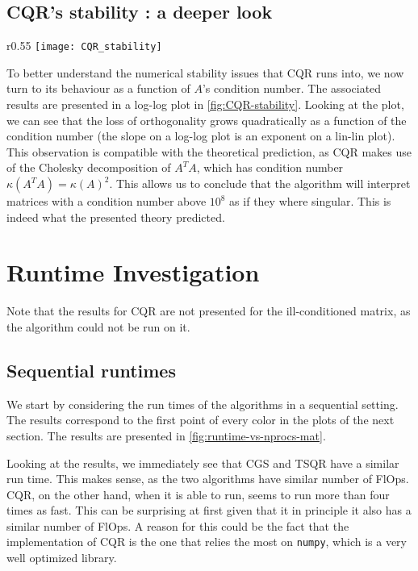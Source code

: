 \documentclass[a4paper, 12pt,oneside]{article}
\begin{document}
			\subsection{CQR's stability : a deeper look}
			\begin{wrapfigure}[18]{r}{0.55\textwidth}
				\centering
				\vspace{-3em}
				\texttt{[image: CQR\_stability]}
				\caption{Loss of orthogonality of the $Q$ matrix obtained by CQR as a function of $A$'s condition number.}
				\label{fig:CQR-stability}
			\end{wrapfigure}
			To better understand the numerical stability issues that CQR runs into, we now turn to its behaviour as a function of $A$'s condition number. The associated results are presented in a log-log plot in \ref{fig:CQR-stability}.
			Looking at the plot, we can see that the loss of orthogonality grows quadratically as a function of the condition number (the slope on a log-log plot is an exponent on a lin-lin plot). This observation is compatible with the theoretical prediction, as CQR makes use of the Cholesky decomposition of $A^TA$, which has condition number $\kappa(A^TA)=\kappa(A)^2$. This allows us to conclude that the algorithm will interpret matrices with a condition number above $10^8$ as if they where singular. This is indeed what the presented theory predicted. 
	\section{Runtime Investigation}
		Note that the results for CQR are not presented for the ill-conditioned matrix, as the algorithm could not be run on it.
		\subsection{Sequential runtimes}
		We start by considering the run times of the algorithms in a sequential setting. The results correspond to the first point of every color in the plots of the next section. The results are presented in \ref{fig:runtime-vs-nprocs-mat}.
		
		Looking at the results, we immediately see that CGS and TSQR have a similar run time. This makes sense, as the two algorithms have similar number of FlOps. CQR, on the other hand, when it is able to run, seems to run more than four times as fast. This can be surprising at first given that it in principle it also has a similar number of FlOps. A reason for this could be the fact that the implementation of CQR is the one that relies the most on \texttt{numpy}, which is a very well optimized library.
\end{document}
